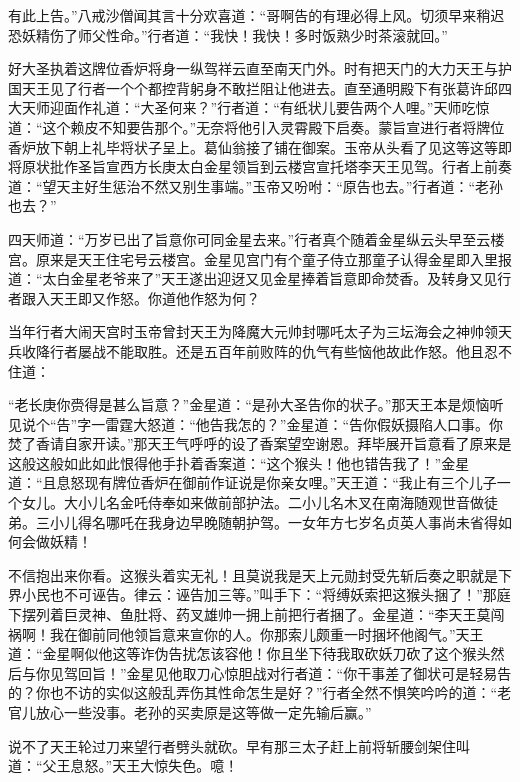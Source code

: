 \documentclass[12pt,UTF8]{ctexbook}
\begin{document}
{	有此上告。”八戒沙僧闻其言十分欢喜道：“哥啊告的有理必得上风。切须早来稍迟恐妖精伤了师父性命。”行者道：“我快！我快！多时饭熟少时茶滚就回。”
	
	好大圣执着这牌位香炉将身一纵驾祥云直至南天门外。时有把天门的大力天王与护国天王见了行者一个个都控背躬身不敢拦阻让他进去。直至通明殿下有张葛许邱四大天师迎面作礼道：“大圣何来？”行者道：“有纸状儿要告两个人哩。”天师吃惊道：“这个赖皮不知要告那个。”无奈将他引入灵霄殿下启奏。蒙旨宣进行者将牌位香炉放下朝上礼毕将状子呈上。葛仙翁接了铺在御案。玉帝从头看了见这等这等即将原状批作圣旨宣西方长庚太白金星领旨到云楼宫宣托塔李天王见驾。行者上前奏道：“望天主好生惩治不然又别生事端。”玉帝又吩咐：“原告也去。”行者道：“老孙也去？”
	
	四天师道：“万岁已出了旨意你可同金星去来。”行者真个随着金星纵云头早至云楼宫。原来是天王住宅号云楼宫。金星见宫门有个童子侍立那童子认得金星即入里报道：“太白金星老爷来了”天王遂出迎迓又见金星捧着旨意即命焚香。及转身又见行者跟入天王即又作怒。你道他作怒为何？
	
	当年行者大闹天宫时玉帝曾封天王为降魔大元帅封哪吒太子为三坛海会之神帅领天兵收降行者屡战不能取胜。还是五百年前败阵的仇气有些恼他故此作怒。他且忍不住道：
	
	“老长庚你赍得是甚么旨意？”金星道：“是孙大圣告你的状子。”那天王本是烦恼听见说个“告”字一雷霆大怒道：“他告我怎的？”金星道：“告你假妖摄陷人口事。你焚了香请自家开读。”那天王气呼呼的设了香案望空谢恩。拜毕展开旨意看了原来是这般这般如此如此恨得他手扑着香案道：“这个猴头！他也错告我了！”金星道：“且息怒现有牌位香炉在御前作证说是你亲女哩。”天王道：“我止有三个儿子一个女儿。大小儿名金吒侍奉如来做前部护法。二小儿名木叉在南海随观世音做徒弟。三小儿得名哪吒在我身边早晚随朝护驾。一女年方七岁名贞英人事尚未省得如何会做妖精！
	
	不信抱出来你看。这猴头着实无礼！且莫说我是天上元勋封受先斩后奏之职就是下界小民也不可诬告。律云：诬告加三等。”叫手下：“将缚妖索把这猴头捆了！”那庭下摆列着巨灵神、鱼肚将、药叉雄帅一拥上前把行者捆了。金星道：“李天王莫闯祸啊！我在御前同他领旨意来宣你的人。你那索儿颇重一时捆坏他阁气。”天王道：“金星啊似他这等诈伪告扰怎该容他！你且坐下待我取砍妖刀砍了这个猴头然后与你见驾回旨！”金星见他取刀心惊胆战对行者道：“你干事差了御状可是轻易告的？你也不访的实似这般乱弄伤其性命怎生是好？”行者全然不惧笑吟吟的道：“老官儿放心一些没事。老孙的买卖原是这等做一定先输后赢。”
	
	说不了天王轮过刀来望行者劈头就砍。早有那三太子赶上前将斩腰剑架住叫道：“父王息怒。”天王大惊失色。噫！
	
}
\end{document}
